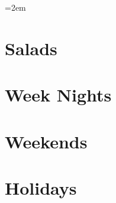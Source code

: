 \documentclass[landscape,12pt,openany]{book}
\begin{document}
\rmfamily

\setlength{\columnseprule}{0pt}
\columnsep=2em

\setcounter{tocdepth}{1}
\small
\tableofcontents

\newpage
\thispagestyle{empty}
\mbox{}

\normalsize

\setlength{\parskip}{.5em}

\chapter{Salads}








\chapter{Week Nights}











\chapter{Weekends}










\chapter{Holidays}


\setlength{\parskip}{0pt}
\listoffigures
\end{document}
